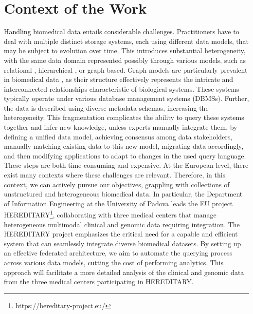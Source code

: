 
\chapter{Context of the Work}
\label{chp:context}
Handling biomedical data entails considerable challenges. Practitioners have to deal with multiple distinct storage systems, each using different data models, that may be subject to evolution over time. This introduces substantial heterogeneity, with the same data domain represented possibly through various models, such as relational \cite{DBLP:journals/nar/HardingAFSADPSD22}, hierarchical \cite{DBLP:journals/nar/WishartKGSHSCW06}, or graph based. Graph models are particularly prevalent in biomedical data \cite{DBLP:journals/nar/PineroBQGDCGSF17} \cite{DBLP:journals/nar/GillespieJSMRSG22}, as their structure effectively represents the intricate and interconnected relationships characteristic of biological systems.
These systems typically operate under various database management systems (DBMSs). Further, the data is described using diverse metadata schemas, increasing the heterogeneity. This fragmentation complicates the ability to query these systems together and infer new knowledge, unless experts manually integrate them, by defining a unified data model, achieving consensus among data stakeholders, manually matching existing data to this new model, migrating data accordingly, and then modifying applications to adapt to changes in the used query language. These steps are both time-consuming and expensive.
At the European level, there exist many contexts where these challenges are relevant. Therefore, in this context, we can actively pursue our objectives, grappling with collections of unstructured and heterogeneous biomedical data. In particular, the Department of Information Engineering at the University of Padova leads the EU project \ac{HEREDITARY}\footnote{https://hereditary-project.eu/}, collaborating with three medical centers that manage heterogeneous multimodal clinical and genomic data requiring integration. The \ac{HEREDITARY} project emphasizes the critical need for a capable and efficient system that can seamlessly integrate diverse biomedical datasets. By setting up an effective federated architecture, we aim to automate the querying process across various data models, cutting the cost of performing analytics. This approach will facilitate a more detailed analysis of the clinical and genomic data from the three medical centers participating in \ac{HEREDITARY}.

